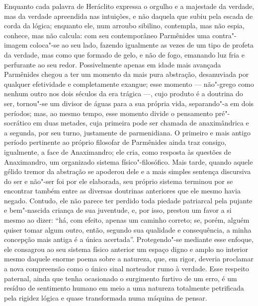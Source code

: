 Enquanto cada palavra de Heráclito expressa o orgulho e a majestade da
verdade, mas da verdade apreendida nas intuições, e não daquela que subiu
pela escada de corda da lógica; enquanto ele, num arroubo sibilino,
contempla, mas não espia, conhece, mas não calcula: com seu contemporâneo
Parmênides uma contra"-imagem coloca"-se \label{comseucontemporaneo} ao seu
lado, fazendo igualmente as vezes de um tipo de profeta da verdade, mas como
que formado de gelo, e não de fogo, emanando luz fria e perfurante ao seu
redor. Possivelmente apenas em idade mais avançada Parmênides chegou a ter um
momento da mais pura abstração, desanuviada por qualquer efetividade e
completamente exangue; esse momento --- não"-grego como nenhum outro nos dois
séculos da era trágica ---, cujo produto é a doutrina do ser, tornou"-se um
divisor de águas para a sua própria vida, separando"-a em dois períodos; mas,
ao mesmo tempo, esse momento divide o pensamento pré"-socrático em duas
metades, cuja primeira pode ser chamada de anaximândrica e a segunda, por seu
turno, justamente de parmenidiana. O primeiro e mais antigo período
pertinente ao próprio filosofar de Parmênides ainda traz consigo, igualmente,
a face de Anaximandro; ele cria, como resposta às questões de Anaximandro, um
organizado sistema físico"-filosófico. Mais tarde, quando aquele gélido
tremor da abstração se apoderou dele e a mais simples sentença discursiva do
ser e não"-ser foi por ele elaborada, seu próprio sistema terminou por se
encontrar também entre as diversas doutrinas anteriores que ele mesmo havia
negado. Contudo, ele não parece ter perdido toda piedade patriarcal pela
pujante e bem"-nascida criança de sua juventude, e, por isso, prestou um
favor a si mesmo ao dizer: ``há, com efeito, apenas um caminho correto; se,
porém, alguém quiser tomar algum outro, então, segundo sua qualidade e
consequência, a minha concepção mais antiga é a única acertada''.
Protegendo"-se mediante esse enfoque, ele consagrou ao seu sistema físico
anterior um espaço digno e amplo no interior mesmo daquele enorme poema sobre
a natureza, que, em rigor, deveria proclamar a nova compreensão como o único
sinal norteador rumo à verdade. Esse respeito paternal, ainda que tenha
ocasionado o surgimento furtivo de um erro, é um resíduo de sentimento humano
em meio a uma natureza totalmente petrificada pela rigidez lógica e quase
transformada numa máquina de pensar.

